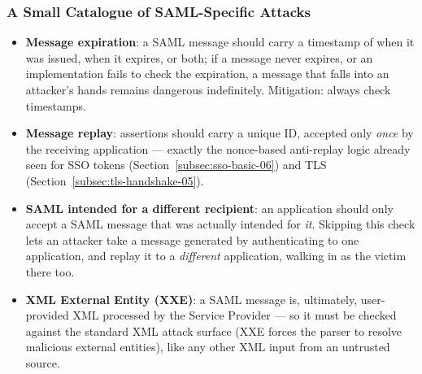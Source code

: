 \documentclass[12pt, a4paper]{article}
\begin{document}
\subsubsection{A Small Catalogue of SAML-Specific Attacks}
\begin{itemize}
    \item \textbf{Message expiration}: a SAML message should carry a timestamp of when it was issued, when it expires, or both; if a message never expires, or an implementation fails to check the expiration, a message that falls into an attacker's hands remains dangerous indefinitely. Mitigation: always check timestamps.
    \item \textbf{Message replay}: assertions should carry a unique ID, accepted only \emph{once} by the receiving application --- exactly the nonce-based anti-replay logic already seen for SSO tokens (Section~\ref{subsec:sso-basic-06}) and TLS (Section~\ref{subsec:tls-handshake-05}).
    \item \textbf{SAML intended for a different recipient}: an application should only accept a SAML message that was actually intended for \emph{it}. Skipping this check lets an attacker take a message generated by authenticating to one application, and replay it to a \emph{different} application, walking in as the victim there too.
    \item \textbf{XML External Entity (XXE)}: a SAML message is, ultimately, user-provided XML processed by the Service Provider --- so it must be checked against the standard XML attack surface (XXE forces the parser to resolve malicious external entities), like any other XML input from an untrusted source.
\end{itemize}
\end{document}
